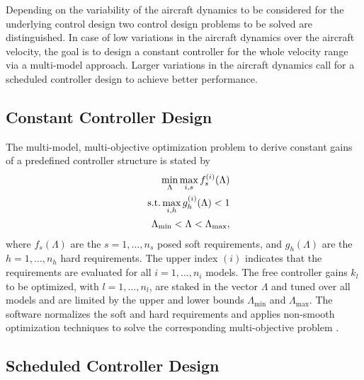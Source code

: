 \documentclass[aerospace,article,submit,moreauthors,pdftex,10pt,a4paper]{Definitions/mdpi}
\begin{document}
Depending on the variability of the aircraft dynamics to be considered for the underlying control design two control design problems to be solved are distinguished. In case of low variations in the aircraft dynamics over the aircraft velocity, the goal is to design a constant controller for the whole velocity range via a multi-model approach. Larger variations in the aircraft dynamics call for a scheduled controller design to achieve better performance. 


\subsection{Constant Controller Design}

The multi-model, multi-objective optimization problem  to derive constant gains of a predefined controller structure \cite{Apkarian14}  is stated by
\begin{eqnarray}\label{eq:problem1}
&&\min_\Lambda \max_{i,s} f_{s}^{(i)}(\Lambda) \\
&&\textnormal{s.t.} \max_{i,h} g_{h}^{(i)}(\Lambda) < 1 \nonumber \\
&& \Lambda_{\min} < \Lambda < \Lambda_{\max}, \nonumber 
\end{eqnarray}
where $f_{s}(\Lambda)$ are the $s=1,\dots,n_s$ posed soft requirements, and  $g_{h}(\Lambda)$ are the  $h=1,\dots,n_h$ hard requirements. The upper index $(i)$ indicates that the requirements are evaluated for all  $i= 1,\dots, n_i$ models.
The free controller gains $k_l$ to be optimized, with $l=1,\dots,n_l$,  are staked in the vector $\Lambda$ and tuned over all models and are limited by the upper and lower bounds $\Lambda_{\min}$ and $\Lambda_{\max}$. The software normalizes the soft and hard requirements and applies non-smooth optimization techniques to solve the corresponding multi-objective problem  \cite{Apkarian06}.



\subsection{Scheduled Controller Design}
\end{document}
